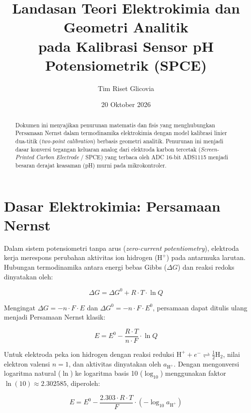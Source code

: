 \documentclass[12pt,a4paper]{article}
\title{\textbf{Landasan Teori Elektrokimia dan Geometri Analitik\\pada Kalibrasi Sensor pH Potensiometrik (SPCE)}}
\author{Tim Riset Glicovia}
\date{20 Oktober 2026}
\begin{document}
\maketitle

\begin{abstract}
Dokumen ini menyajikan penurunan matematis dan fisis yang menghubungkan Persamaan Nernst dalam termodinamika elektrokimia dengan model kalibrasi linier dua-titik (\textit{two-point calibration}) berbasis geometri analitik. Penurunan ini menjadi dasar konversi tegangan keluaran analog dari elektroda karbon tercetak (\textit{Screen-Printed Carbon Electrode} / SPCE) yang terbaca oleh ADC 16-bit ADS1115 menjadi besaran derajat keasaman (pH) murni pada mikrokontroler.
\end{abstract}

\vspace{0.5cm}

\section{Dasar Elektrokimia: Persamaan Nernst}

Dalam sistem potensiometri tanpa arus (\textit{zero-current potentiometry}), elektroda kerja merespons perubahan aktivitas ion hidrogen ($\text{H}^+$) pada antarmuka larutan. Hubungan termodinamika antara energi bebas Gibbs ($\Delta G$) dan reaksi redoks dinyatakan oleh:

\begin{equation}
\Delta G = \Delta G^0 + R \cdot T \cdot \ln Q
\end{equation}

Mengingat $\Delta G = -n \cdot F \cdot E$ dan $\Delta G^0 = -n \cdot F \cdot E^0$, persamaan dapat ditulis ulang menjadi Persamaan Nernst klasik:

\begin{equation}
E = E^0 - \frac{R \cdot T}{n \cdot F} \cdot \ln Q
\end{equation}

Untuk elektroda peka ion hidrogen dengan reaksi reduksi $\text{H}^+ + e^- \rightleftharpoons \frac{1}{2}\text{H}_2$, nilai elektron valensi $n = 1$, dan aktivitas dinyatakan oleh $a_{\text{H}^+}$. Dengan mengonversi logaritma natural ($\ln$) ke logaritma basis 10 ($\log_{10}$) menggunakan faktor $\ln(10) \approx 2.302585$, diperoleh:

\begin{equation}
E = E^0 - \frac{2.303 \cdot R \cdot T}{F} \cdot (-\log_{10} a_{\text{H}^+})
\end{equation}
\end{document}

